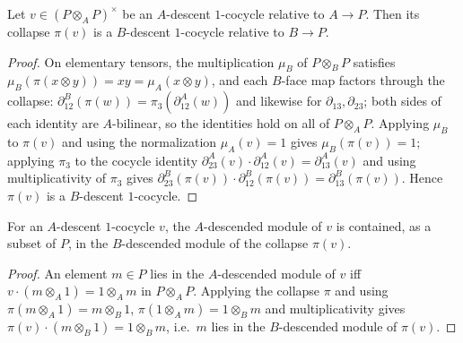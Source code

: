 \begin{theorem}
  \label{pa-thm:module_descentCocycle_collapse}
  \leanok

  Let \(v \in (P \otimes_A P)^{\times}\) be an \(A\)-descent \(1\)-cocycle relative to \(A \to
  P\).  Then its collapse \(\pi(v)\) is a \(B\)-descent \(1\)-cocycle relative to \(B \to P\).
\end{theorem}
\begin{proof}
  \leanok
  On elementary tensors, the multiplication \(\mu_B\) of \(P \otimes_B P\) satisfies \(\mu_B(\pi(x
  \otimes y)) = xy = \mu_A(x \otimes y)\), and each \(B\)-face map factors through the collapse:
  \(\partial^B_{12}(\pi(w)) = \pi_3(\partial^A_{12}(w))\) and likewise for \(\partial_{13},
  \partial_{23}\); both sides of each identity are \(A\)-bilinear, so the identities hold on all
  of \(P \otimes_A P\).  Applying \(\mu_B\) to \(\pi(v)\) and using the normalization
  \(\mu_A(v) = 1\) gives \(\mu_B(\pi(v)) = 1\); applying \(\pi_3\) to the cocycle identity
  \(\partial^A_{23}(v) \cdot \partial^A_{12}(v) = \partial^A_{13}(v)\) and using
  multiplicativity of \(\pi_3\) gives \(\partial^B_{23}(\pi(v)) \cdot \partial^B_{12}(\pi(v)) =
  \partial^B_{13}(\pi(v))\).  Hence \(\pi(v)\) is a \(B\)-descent \(1\)-cocycle.
\end{proof}

\begin{lemma}
  \label{pa-lem:module_descended_le_collapse}
  \leanok

  For an \(A\)-descent \(1\)-cocycle \(v\), the \(A\)-descended module of \(v\) is contained,
  as a subset of \(P\), in the \(B\)-descended module of the collapse \(\pi(v)\).
\end{lemma}
\begin{proof}
  \leanok
  An element \(m \in P\) lies in the \(A\)-descended module of \(v\) iff \(v \cdot (m \otimes_A
  1) = 1 \otimes_A m\) in \(P \otimes_A P\).  Applying the collapse \(\pi\) and using
  \(\pi(m \otimes_A 1) = m \otimes_B 1\), \(\pi(1 \otimes_A m) = 1 \otimes_B m\) and
  multiplicativity gives \(\pi(v) \cdot (m \otimes_B 1) = 1 \otimes_B m\), i.e.\ \(m\) lies in
  the \(B\)-descended module of \(\pi(v)\).
\end{proof}

